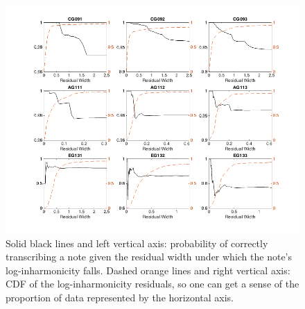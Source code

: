 \documentclass[12pt]{cmuthesis}
\begin{document}
\begin{figure}[!htbp] 
\centering
\includegraphics[angle=90,scale=0.65]{p-correct-res}
\caption{Solid black lines and left vertical axis: probability of correctly transcribing a note given the residual width under which the note's log-inharmonicity falls. Dashed orange lines and right vertical axis: CDF of the log-inharmonicity residuals, so one can get a sense of the proportion of data represented by the horizontal axis.}
\label{fig:p-correct-res}
\end{figure} 


\end{document}
